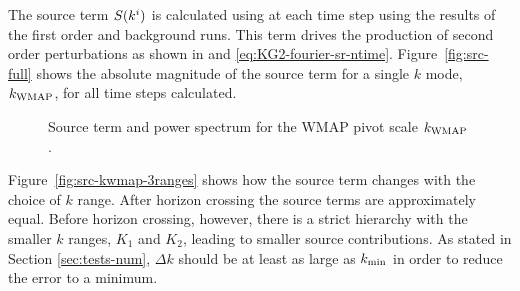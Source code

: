 The source term $S(k^i)$ is calculated using  at each time
step using the results of the first order and background runs. This term
drives the production of second order perturbations as shown in
 and
\eqref{eq:KG2-fourier-sr-ntime}. Figure~\ref{fig:src-full} shows the
absolute magnitude of the source term for a single $k$ mode, $\kwmap$,
for all time steps calculated.
% 
\begin{figure}
\centering
{}\qquad
% 
\caption[The source term and power spectrum for $\kwmap$]{Source term and power
spectrum for the WMAP pivot scale $\kwmap$.}
\end{figure}
% 
Figure~\ref{fig:src-kwmap-3ranges} shows how the source term changes
with the choice of $k$ range.  After horizon crossing the source terms
are approximately equal. Before horizon crossing, however, there is a
strict hierarchy with the smaller $k$ ranges, $K_1$ and $K_2$, leading to
smaller source
contributions.  As stated in Section \ref{sec:tests-num}, $\Delta k$
should be at least as large as $k_{\mathrm{min}}$ in order to reduce the error to
a minimum.
% 
